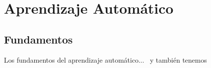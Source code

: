 \chapter{Aprendizaje Automático}

\section{Fundamentos}

Los fundamentos del aprendizaje automático...~\cite{lecun-98} y también tenemos \cite{lecun-89e}

